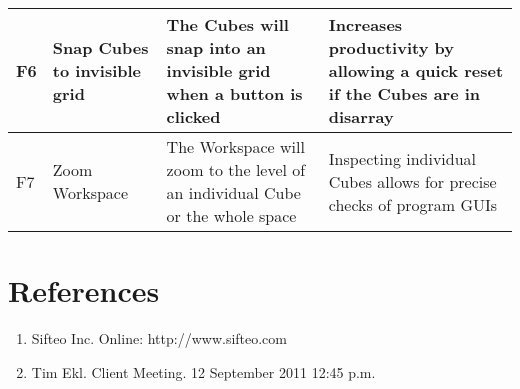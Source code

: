 \documentclass[12pt]{article}
\begin{document}
\begin{landscape}
\begin{table}[h!]
\begin{tabular}{p{.25in} | p{2.75in} | p{3in} | p{3in}}
        F6 &
        Snap Cubes to invisible grid &
        The Cubes will snap into an invisible grid when a button is clicked &
        Increases productivity by allowing a quick reset if the Cubes are in disarray
        \\ \hline

        F7 &
        Zoom Workspace &
        The Workspace will zoom to the level of an individual Cube or the whole space &
        Inspecting individual Cubes allows for precise checks of program \glspl{GUI}\index{GUI}\glsadd{GUIa}
        \\ \hline

      \end{tabular}
    \end{table}
    \end{landscape}

\clearpage
{}
\printglossaries
\clearpage

\section*{References}

        \begin{enumerate}
                \item{Sifteo Inc. Online: http://www.sifteo.com}
                \item{Tim Ekl.  Client Meeting.  12 September 2011 12:45 p.m.}
        \end{enumerate}

\clearpage

\printindex
\end{document}
